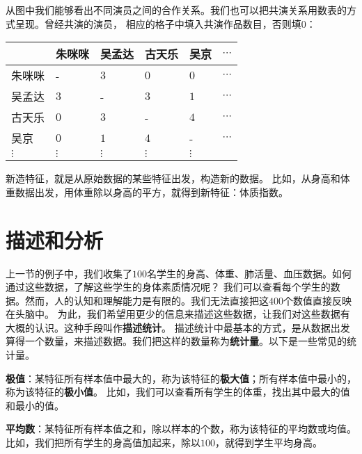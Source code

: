 \documentclass[12pt,UTF8]{ctexbook}
\newtheorem{xt}{习题}[section]
\begin{document}
从图中我们能够看出不同演员之间的合作关系。我们也可以把共演关系用数表的方式呈现。曾经共演的演员，
相应的格子中填入共演作品数目，否则填$0$：
\begin{center}
    \begin{tabular}{ | p{3.2em}<{\centering} | p{3.2em}<{\centering} | p{3.2em}<{\centering} | p{3.2em}<{\centering} | p{3.2em}<{\centering} | p{2em}<{\centering} | }
        \hline
           & 朱咪咪 & 吴孟达 & 古天乐 & 吴京 & $\cdots$ \\ [0.5ex]
        \hline
        朱咪咪 & - & $3$ & $0$ & $0$ & $\cdots$ \\  
        \hline
        吴孟达 & $3$ & - & $3$ & $1$ & $\cdots$ \\  
        \hline
        古天乐 & $0$ & $3$ & - & $4$ & $\cdots$ \\ 
        \hline
        吴京 & $0$ & $1$ & $4$ & - & $\cdots$ \\ 
        \hline
        $\vdots$ & $\vdots$ & $\vdots$ & $\vdots$ & $\vdots$ &  \\  
        \hline
    \end{tabular}
\end{center}

新造特征，就是从原始数据的某些特征出发，构造新的数据。
比如，从身高和体重数据出发，用体重除以身高的平方，就得到新特征：体质指数。


\section{描述和分析}
上一节的例子中，我们收集了$100$名学生的身高、体重、肺活量、血压数据。如何通过这些数据，了解这些学生的身体素质情况呢？
我们可以查看每个学生的数据。然而，人的认知和理解能力是有限的。我们无法直接把这$400$个数值直接反映在头脑中。
为此，我们希望用更少的信息来描述这些数据，让我们对这些数据有大概的认识。这种手段叫作\textbf{描述统计}。
描述统计中最基本的方式，是从数据出发算得一个数量，来描述数据。我们把这样的数量称为\textbf{统计量}。以下是一些常见的统计量。

\textbf{极值}：某特征所有样本值中最大的，称为该特征的\textbf{极大值}；所有样本值中最小的，称为该特征的\textbf{极小值}。
比如，我们可以查看所有学生的体重，找出其中最大的值和最小的值。

\textbf{平均数}：某特征所有样本值之和，除以样本的个数，称为该特征的平均数或均值。
比如，我们把所有学生的身高值加起来，除以$100$，就得到学生平均身高。
\end{document}
